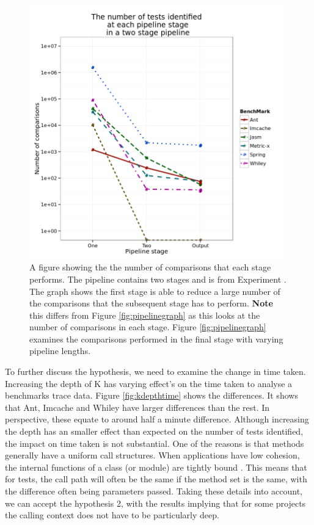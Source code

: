 \begin{figure}[h]
\centering
\includegraphics[width=\textwidth,height=11cm]{stagesinpipeline.png}
\caption[A figure showing the the number of comparisons that each stage in a pipeline of length two performs]{A figure showing the the number of comparisons that each stage performs. The pipeline contains two stages and is from Experiment . The graph shows the first stage is able to reduce a large number of the comparisons that the subsequent stage has to perform. \textbf{Note} this differs from Figure \ref{fig:pipelinegraph} as this looks at the number of comparisons in each stage. Figure \ref{fig:pipelinegraph} examines the comparisons performed in the final stage with varying pipeline lengths.}
\label{fig:stagesinpipeline}
\end{figure}

To further discuss the hypothesis, we need to examine the change in time taken. Increasing the depth of K has varying effect's on the time taken to analyse a benchmarks trace data. Figure \ref{fig:kdepthtime} shows the differences. It shows that Ant, Imcache and Whiley have larger differences than the rest. In perspective, these equate to around half a minute difference. Although increasing the depth has an smaller effect than expected on the number of tests identified, the impact on time taken is not substantial. One of the reasons is that methods generally have a uniform call structures. When applications have low cohesion, the internal functions of a class (or module) are tightly bound \cite{yourdon1979structured}. This means that for tests, the call path will often be the same if the method set is the same, with the difference often being parameters passed. Taking these details into account, we can accept the hypothesis 2, with the results implying that for some projects the calling context does not have to be particularly deep. 

